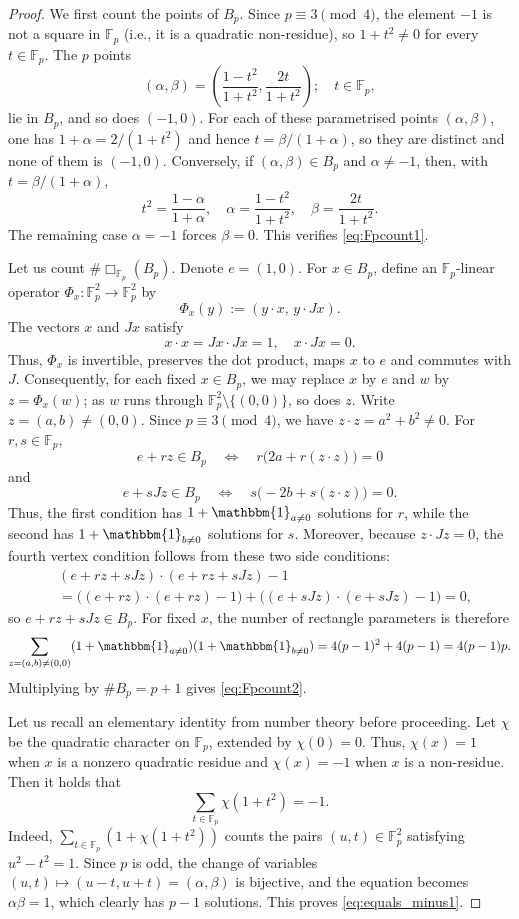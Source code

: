 \documentclass[11pt,reqno]{amsart}
\numberwithin{equation}{section}
\begin{document}
\begin{proof}
We first count the points of $B_p$. Since $p\equiv3\pmod4$, the element $-1$ is not a square in $\mathbb{F}_p$ (i.e., it is a quadratic non-residue), so $1+t^2\ne0$ for every $t\in\mathbb{F}_p$. The $p$ points
\[ (\alpha,\beta) = \left(\frac{1-t^2}{1+t^2},\frac{2t}{1+t^2}\right); \quad t\in\mathbb{F}_p, \]
lie in $B_p$, and so does $(-1,0)$. For each of these parametrised points $(\alpha,\beta)$, one has $1+\alpha=2/(1+t^2)$ and hence $t=\beta/(1+\alpha)$, so they are distinct and none of them is $(-1,0)$. Conversely, if $(\alpha,\beta)\in B_p$ and $\alpha\ne-1$, then, with $t=\beta/(1+\alpha)$,
\[ t^2=\frac{1-\alpha}{1+\alpha},\quad \alpha=\frac{1-t^2}{1+t^2},\quad \beta=\frac{2t}{1+t^2}. \]
The remaining case $\alpha=-1$ forces $\beta=0$. This verifies \eqref{eq:Fpcount1}.

Let us count $\#\Box_{\mathbb{F}_p}(B_p)$. Denote $e=(1,0)$. For $x\in B_p$, define an $\mathbb{F}_p$-linear operator $\Phi_x\colon\mathbb{F}_p^2\to\mathbb{F}_p^2$ by
\[ \Phi_x(y):=(y\cdot x,\,y\cdot Jx). \]
The vectors $x$ and $Jx$ satisfy
\[ x\cdot x=Jx\cdot Jx=1, \quad x\cdot Jx=0. \]
Thus, $\Phi_x$ is invertible, preserves the dot product, maps $x$ to $e$ and commutes with $J$. Consequently, for each fixed $x\in B_p$, we may replace $x$ by $e$ and $w$ by $z=\Phi_x(w)$; as $w$ runs through $\mathbb{F}_p^2\setminus\{(0,0)\}$, so does $z$.
Write $z=(a,b)\neq(0,0)$. Since $p\equiv3\pmod4$, we have $z\cdot z=a^2+b^2\ne0$. For $r,s\in\mathbb{F}_p$,
\[ e+rz\in B_p \quad\Longleftrightarrow\quad r\bigl(2a+r(z\cdot z)\bigr)=0 \]
and
\[ e+sJz\in B_p \quad\Longleftrightarrow\quad s\bigl(-2b+s(z\cdot z)\bigr)=0. \]
Thus, the first condition has $1+\mathbbm{1}_{a\ne0}$ solutions for $r$, while the second has $1+\mathbbm{1}_{b\ne0}$ solutions for $s$. Moreover, because $z\cdot Jz=0$, the fourth vertex condition follows from these two side conditions:
\begin{align*} 
& (e+rz+sJz)\cdot(e+rz+sJz)-1 \\
& = \bigl((e+rz)\cdot(e+rz)-1\bigr) + \bigl((e+sJz)\cdot(e+sJz)-1\bigr) = 0,
\end{align*}
so $e+rz+sJz\in B_p$.
For fixed $x$, the number of rectangle parameters is therefore
\[ \sum_{z=(a,b)\neq(0,0)} (1+\mathbbm{1}_{a\ne0})(1+\mathbbm{1}_{b\ne0}) =4(p-1)^2+4(p-1)=4(p-1)p. \]
Multiplying by $\#B_p=p+1$ gives \eqref{eq:Fpcount2}.

Let us recall an elementary identity from number theory before proceeding. Let $\chi$ be the quadratic character on $\mathbb{F}_p$, extended by $\chi(0)=0$. Thus, $\chi(x)=1$ when $x$ is a nonzero quadratic residue and $\chi(x)=-1$ when $x$ is a non-residue. Then it holds that
\begin{equation}\label{eq:equals_minus1} 
\sum_{t\in\mathbb{F}_p}\chi(1+t^2)=-1. 
\end{equation}
Indeed, $\sum_{t\in\mathbb{F}_p}(1+\chi(1+t^2))$ counts the pairs $(u,t)\in\mathbb{F}_p^2$ satisfying $u^2-t^2=1$. Since $p$ is odd, the change of variables $(u,t)\mapsto(u-t,u+t)=(\alpha,\beta)$ is bijective, and the equation becomes $\alpha \beta=1$, which clearly has $p-1$ solutions. This proves \eqref{eq:equals_minus1}.


\end{proof}
\end{document}
